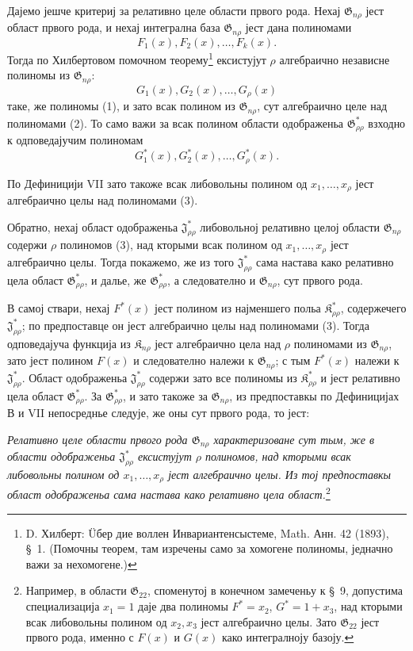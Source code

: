 ﻿\documentclass[11pt]{article}
\providecommand{\Kfield}{\mathfrak{K}}
\providecommand{\Jdom}{\mathfrak{J}}
\providecommand{\Gdom}{\mathfrak{G}}
\begin{document}
Дајемо јешче критериј за релативно целе области првого рода. Нехај $\Gdom_{n\rho}$ јест област првого рода, и нехај интегрална база $\Gdom_{n\rho}$ јест дана полиномами
\begin{equation}
  F_1(x),F_2(x),\ldots,F_k(x).
\tag{1}
\end{equation}
Тогда по Хилбертовом помочном теорему\footnote{D. Хилберт: Üбер дие воллен Инвариантенсыстеме, Math. Анн. 42 (1893), \S\ 1. (Помочны теорем, там изречены само за хомогене полиномы, једначно важи за нехомогене.)} ексистујут $\rho$ алгебраично независне полиномы из $\Gdom_{n\rho}$:
\begin{equation}
  G_1(x),G_2(x),\ldots,G_\rho(x)
\tag{2}
\end{equation}
таке, же полиномы (1), и зато всак полином из $\Gdom_{n\rho}$, сут алгебраично целе над полиномами (2). То само важи за всак полином области одображеньа $\Gdom^*_{\rho\rho}$ взходно к одповедајучим полиномам
\begin{equation}
  G_1^*(x),G_2^*(x),\ldots,G_\rho^*(x).
\tag{3}
\end{equation}

По Дефиницији VII зато такоже всак либовольны полином од $x_1,\ldots,x_\rho$ јест алгебраично целы над полиномами (3).

Обратно, нехај област одображеньа $\Jdom^*_{\rho\rho}$ либовольној релативно целој области $\Gdom_{n\rho}$ содержи $\rho$ полиномов (3), над кторыми всак полином од $x_1,\ldots,x_\rho$ јест алгебраично целы. Тогда покажемо, же из того $\Jdom^*_{\rho\rho}$ сама настава како релативно цела област $\Gdom^*_{\rho\rho}$, и далье, же $\Gdom^*_{\rho\rho}$, а следователно и $\Gdom_{n\rho}$, сут првого рода.

В самој ствари, нехај $F^*(x)$ јест полином из најменшего польа $\Kfield^*_{\rho\rho}$, содержечего $\Jdom^*_{\rho\rho}$; по предпоставце он јест алгебраично целы над полиномами (3). Тогда одповедајуча функција из $\Kfield_{n\rho}$ јест алгебраично цела над $\rho$ полиномами из $\Gdom_{n\rho}$, зато јест полином $F(x)$ и следователно належи к $\Gdom_{n\rho}$; с тым $F^*(x)$ належи к $\Jdom^*_{\rho\rho}$. Област одображеньа $\Jdom^*_{\rho\rho}$ содержи зато все полиномы из $\Kfield^*_{\rho\rho}$ и јест релативно цела област $\Gdom^*_{\rho\rho}$. За $\Gdom^*_{\rho\rho}$, и зато такоже за $\Gdom_{n\rho}$, из предпоставкы по Дефиницијах В и VII непосреднье следује, же оны сут првого рода, то јест:

{\itshape Релативно целе области првого рода $\Gdom_{n\rho}$ характеризоване сут тым, же в области одображеньа $\Jdom^*_{\rho\rho}$ ексистујут $\rho$ полиномов, над кторыми всак либовольны полином од $x_1,\ldots,x_\rho$ јест алгебраично целы. Из тој предпоставкы област одображеньа сама настава како релативно цела област.}\footnote{Например, в области $\Gdom_{22}$, споменутој в конечном замеченьу к \S\ 9, допустима специализација $x_1=1$ даје два полиномы $F^*=x_2$, $G^*=1+x_3$, над кторыми всак либовольны полином од $x_2,x_3$ јест алгебраично целы. Зато $\Gdom_{22}$ јест првого рода, именно с $F(x)$ и $G(x)$ како интегралноју базоју.}
\end{document}
